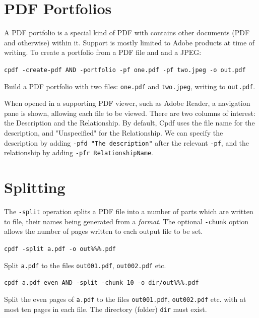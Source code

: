 \documentclass{book}
\begin{document}
\section{PDF Portfolios}

A PDF portfolio is a special kind of PDF with contains other documents (PDF and otherwise) within it. Support is mostly limited to Adobe products at time of writing. To create a portfolio from a PDF file and and a JPEG:

  \begin{framed}\small
    \noindent\verb!cpdf -create-pdf AND -portfolio -pf one.pdf -pf two.jpeg -o out.pdf!

    \vspace{2.5mm}
    \noindent Build a PDF portfolio with two files: \texttt{one.pdf} and \texttt{two.jpeg}, writing to \texttt{out.pdf}.
  \end{framed}

\noindent When opened in a supporting PDF viewer, such as Adobe Reader, a navigation pane is shown, allowing each file to be viewed. There are two columns of interest: the Description and the Relationship. By default, Cpdf uses the file name for the description, and "Unspecified" for the Relationship. We can specify the description by adding \texttt{-pfd "The description"} after the relevant \texttt{-pf}, and the relationship by adding \texttt{-pfr RelationshipName}.

  \section{Splitting}
   The \texttt{-split} operation splits a PDF file into a number of parts which
are written to file, their names being generated from a \emph{format}. The
optional \texttt{-chunk} option allows the number of pages written to each
output file to be set. 

  \begin{framed}\small
    \noindent\verb!cpdf -split a.pdf -o out%%%.pdf!

    \vspace{2.5mm}
    \noindent Split \texttt{a.pdf} to the files \texttt{out001.pdf}, \texttt{out002.pdf} etc.

    \vspace{2.5mm}
    \noindent\verb!cpdf a.pdf even AND -split -chunk 10 -o dir/out%%%.pdf!

    \vspace{2.5mm}
    \noindent Split the even pages of \texttt{a.pdf} to the files
\texttt{out001.pdf}, \texttt{out002.pdf} etc. with at most ten pages in each
file. The directory (folder) \texttt{dir} must exist.
  \end{framed}
\end{document}
